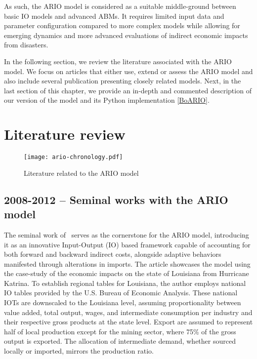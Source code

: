 As such, the ARIO model is considered as a suitable middle-ground between basic
IO models and advanced ABMs. It requires limited input data and parameter
configuration compared to more complex models while allowing for emerging
dynamics and more advanced evaluations of indirect economic impacts from disasters.

In the following section, we review the literature associated with the ARIO
model. We focus on articles that either use, extend or assess the ARIO model and also
include several publication presenting closely related models. Next, in the last section of
this chapter, we provide an in-depth and commented description of our version of
the model and its Python implementation
[\href{https://spjuhel.github.io/BoARIO/}{BoARIO}].

\section{Literature review}
\label{sec:ario-literature}

\begin{figure}[h!]
  \centering
  \texttt{[image: ario-chronology.pdf]}
  \caption{Literature related to the ARIO model\label{fig:ario_chronology}}
\end{figure}

\subsection{2008-2012 -- Seminal works with the ARIO model}
The seminal work of~\textcite{hallegatte-2008-adapt-region}
serves as the cornerstone for the ARIO model, introducing it as an innovative
Input-Output (IO) based framework capable of accounting for both forward and
backward indirect costs, alongside adaptive behaviors manifested through
alterations in imports. The article showcases the model using the case-study of
the economic impacts on the state of Louisiana from Hurricane Katrina.
To establish regional tables for Louisiana,
the author employs national IO
tables provided by the U.S. Bureau of Economic Analysis. These national IOTs are
downscaled to the Louisiana level, assuming proportionality between value added,
total output, wages, and intermediate consumption per industry and their
respective gross products at the state level. Export are assumed to represent
half of local production except for the mining sector,
where 75\% of the gross output is exported. The allocation of intermediate
demand, whether sourced locally or imported, mirrors the production ratio.

